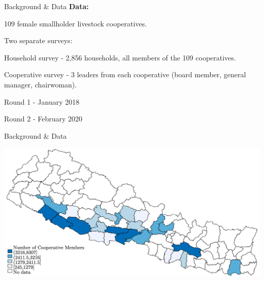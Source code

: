 \documentclass[aspectratio=169]{beamer}
\newenvironment{wideitemize}{\itemize\addtolength{\itemsep}{10pt}}{\enditemize}
\begin{document}
\begin{frame}{Background \& Data}
\textbf{Data:} \vspace{.5cm}
    \begin{wideitemize}
        \item 109 female smallholder livestock cooperatives. 
        \item Two separate surveys: \vspace{.25cm}
            \begin{wideitemize}
                \item Household survey - 2,856 households, all members of the 109 cooperatives.
                \item Cooperative survey - 3 leaders from each cooperative (board member, general manager, chairwoman). 
            \end{wideitemize}
        \item Round 1 - January 2018 
        \item Round 2 - February 2020
    \end{wideitemize}
\end{frame}

\begin{frame}{Background \& Data}
    \begin{center}
        \includegraphics[width=.9\textwidth,trim=4 4 4 4,clip]{StudyMap.png}
    \end{center}
\end{frame}
\end{document}
